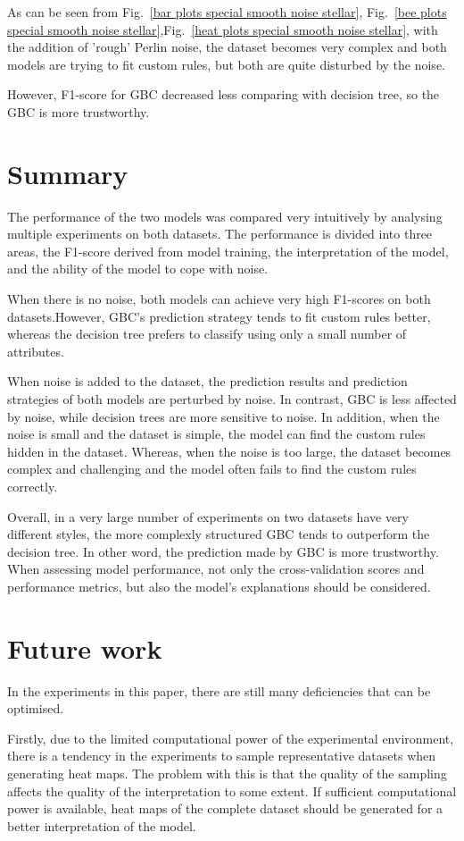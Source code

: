 \documentclass[runningheads,a4paper]{llncs}
\begin{document}
As can be seen from Fig.~\ref{bar plots special smooth noise stellar}, Fig.~\ref{bee plots special smooth noise stellar},Fig.~\ref{heat plots special smooth noise stellar}, with the addition of 'rough' Perlin noise, the dataset becomes very complex and both models are trying to fit custom rules, but both are quite disturbed by the noise.

However, F1-score for GBC decreased less comparing with decision tree, so the GBC is more trustworthy.
\section{Summary}
The performance of the two models was compared very intuitively by analysing multiple experiments on both datasets.
The performance is divided into three areas, the F1-score derived from model training, the interpretation of the model, and the ability of the model to cope with noise.

When there is no noise, both models can achieve very high F1-scores on both datasets.However, GBC's prediction strategy tends to fit custom rules better, whereas the decision tree prefers to classify using only a small number of attributes.

When noise is added to the dataset, the prediction results and prediction strategies of both models are perturbed by noise. In contrast, GBC is less affected by noise, while decision trees are more sensitive to noise. In addition, when the noise is small and the dataset is simple, the model can find the custom rules hidden in the dataset. Whereas, when the noise is too large, the dataset becomes complex and challenging and the model often fails to find the custom rules correctly.

Overall, in a very large number of experiments on two datasets have very different styles, the more complexly structured GBC tends to outperform the decision tree. In other word, the prediction made by GBC is more trustworthy. When assessing model performance, not only the cross-validation scores and performance metrics, but also the model's explanations should be considered.

\section{Future work}

In the experiments in this paper, there are still many deficiencies that can be optimised.

Firstly, due to the limited computational power of the experimental environment, there is a tendency in the experiments to sample representative datasets when generating heat maps. The problem with this is that the quality of the sampling affects the quality of the interpretation to some extent. If sufficient computational power is available, heat maps of the complete dataset should be generated for a better interpretation of the model.
\end{document}
